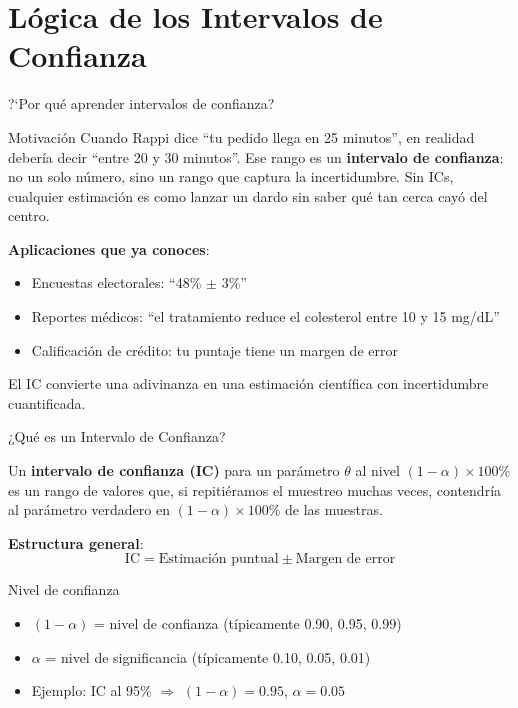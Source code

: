 \documentclass[aspectratio=169, 11pt]{beamer}
\begin{document}
\section{Lógica de los Intervalos de Confianza}

\begin{frame}{?`Por qu\'e aprender intervalos de confianza?}
\begin{exampleblock}{Motivaci\'on}
Cuando Rappi dice ``tu pedido llega en 25 minutos'', en realidad deber\'ia decir ``entre 20 y 30 minutos''. Ese rango es un \textbf{intervalo de confianza}: no un solo n\'umero, sino un rango que captura la incertidumbre. Sin ICs, cualquier estimaci\'on es como lanzar un dardo sin saber qu\'e tan cerca cay\'o del centro.
\end{exampleblock}

\textbf{Aplicaciones que ya conoces}:
\begin{itemize}\setlength{\itemsep}{1pt}
  \item Encuestas electorales: ``48\% $\pm$ 3\%''
  \item Reportes m\'edicos: ``el tratamiento reduce el colesterol entre 10 y 15 mg/dL''
  \item Calificaci\'on de cr\'edito: tu puntaje tiene un margen de error
\end{itemize}

\alert{El IC convierte una adivinanza en una estimaci\'on cient\'ifica con incertidumbre cuantificada.}
\end{frame}

\begin{frame}{¿Qué es un Intervalo de Confianza?}
\begin{definition}
Un \textbf{intervalo de confianza (IC)} para un parámetro $\theta$ al nivel $(1-\alpha) \times 100\%$ es un rango de valores que, si repitiéramos el muestreo muchas veces, contendría al parámetro verdadero en $(1-\alpha) \times 100\%$ de las muestras.
\end{definition}

\vspace{0.3cm}
\textbf{Estructura general}:
\[
\text{IC} = \text{Estimación puntual} \pm \text{Margen de error}
\]

\vspace{0.3cm}
\begin{block}{Nivel de confianza}
\begin{itemize}
  \item $(1-\alpha)$ = nivel de confianza (típicamente 0.90, 0.95, 0.99)
  \item $\alpha$ = nivel de significancia (típicamente 0.10, 0.05, 0.01)
  \item Ejemplo: IC al 95\% $\Rightarrow$ $(1-\alpha) = 0.95$, $\alpha = 0.05$
\end{itemize}
\end{block}
\end{frame}
\end{document}
